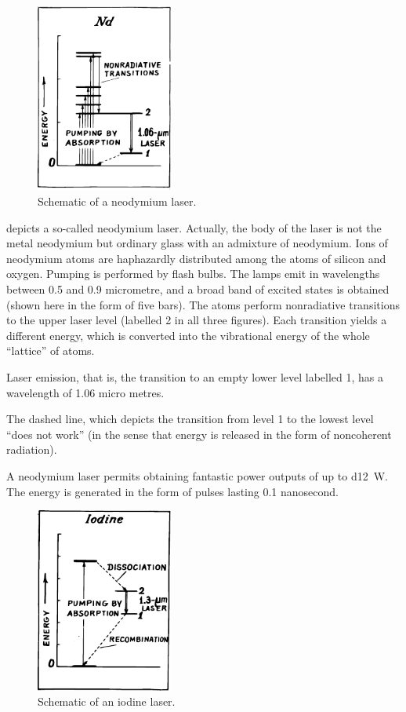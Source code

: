 \begin{figure}[!ht]
\centering
\includegraphics[width=0.4\textwidth]{figures/fig-01-06.pdf}
\caption{Schematic of a neodymium laser.}
\label{fig-1.6}
\end{figure}


 depicts a so-called neodymium laser. Actually, the body of the laser is not the metal neodymium but ordinary glass with an admixture of neodymium. Ions of neodymium atoms are haphazardly distributed among the atoms of silicon and oxygen. Pumping is performed by flash bulbs. The lamps emit in wavelengths between 0.5 and 0.9 micrometre, and a broad band of excited states is obtained (shown here in the form of five bars). The atoms perform nonradiative transitions to the upper laser level (labelled 2 in all three figures). Each transition yields a different energy, which is converted into the vibrational energy of the whole ``lattice'' of atoms.

Laser emission, that is, the transition to an empty lower level labelled 1, has a wavelength of 1.06 micro metres. 

The dashed line, which depicts the transition from level 1 to the lowest level ``does not work'' (in the sense that energy is released in the form of noncoherent radiation).

A neodymium laser permits obtaining fantastic power outputs of up to \SI{d12}{\watt}. The energy is generated in the form of pulses lasting 0.1 nanosecond.

\begin{figure}[!ht]
\centering
\includegraphics[width=0.4\textwidth]{figures/fig-01-07.pdf}
\caption{Schematic of an iodine laser.}
\label{fig-1.7}
\end{figure}

